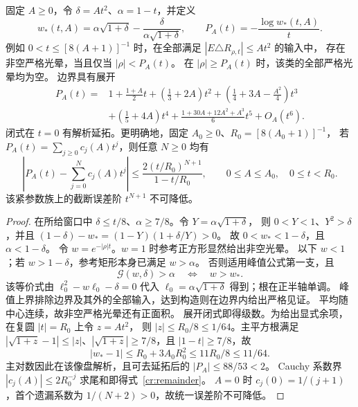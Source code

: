 \begin{corollary}[严格光晕的精确非空边界]\label{cr:phase}
固定 $A\ge0$，令 $\delta=At^2$、$\alpha=1-t$，并定义
\begin{equation}\label{cr:phase-exact}
 w_*(t,A)=\alpha\sqrt{1+\delta}-\frac{\delta}{\alpha\sqrt{1+\delta}},\qquad
 P_A(t)=-\frac{\log w_*(t,A)}t.
\end{equation}
例如 $0<t\le[8(A+1)]^{-1}$ 时，在全部满足 $|E\triangle R_{\rho,t}|\le At^2$ 的输入中，
存在非空严格光晕，当且仅当 $|\rho|<P_A(t)$。
在 $|\rho|\ge P_A(t)$ 时，该类的全部严格光晕均为空。
边界具有展开
\begin{align}\label{cr:phase-series}
 P_A(t)={}&1+\frac{1+A}{2}t+\left(\frac13+2A\right)t^2
 +\left(\frac14+3A-\frac{A^2}{4}\right)t^3\\
 &+\left(\frac15+4A\right)t^4
 +\frac{1+30A+12A^2+A^3}{6}t^5+O_A(t^6).\nonumber
\end{align}
闭式在 $t=0$ 有解析延拓。更明确地，固定 $A_0\ge0$、$R_0=[8(A_0+1)]^{-1}$，
若 $P_A(t)=\sum_{j\ge0}c_j(A)t^j$，则任意 $N\ge0$ 均有
\begin{equation}\label{cr:remainder}
 \left|P_A(t)-\sum_{j=0}^Nc_j(A)t^j\right|
 \le\frac{2(t/R_0)^{N+1}}{1-t/R_0},
 \qquad 0\le A\le A_0,\quad0\le t<R_0.
\end{equation}
该紧参数族上的截断误差阶 $t^{N+1}$ 不可降低。
\end{corollary}

\begin{proof}
在所给窗口中 $\delta\le t/8$、$\alpha\ge7/8$。令 $Y=\alpha\sqrt{1+\delta}$，
则 $0<Y<1$、$Y^2>\delta$，并且
$(1-\delta)-w_*=(1-Y)(1+\delta/Y)>0$。
故 $0<w_*<1-\delta$，且 $\alpha<1-\delta$。
令 $w=e^{-|\rho|t}$。$w=1$ 时参考正方形显然给出非空光晕。
以下 $w<1$；若 $w>1-\delta$，参考矩形本身已满足 $w>\alpha$。
否则适用峰值公式第一支，且
\[
 \mathcal G(w,\delta)>\alpha
 \quad\Longleftrightarrow\quad w>w_*.
\]
该等价式由 $\ell_0^2-w\ell_0-\delta=0$ 代入
$\ell_0=\alpha\sqrt{1+\delta}$ 得到；根在正半轴单调。
峰值上界排除边界及其外的全部输入，达到构造则在边界内给出严格见证。
平均随中心连续，故非空严格光晕还有正面积。
展开闭式即得级数。为给出显式余项，在复圆 $|t|=R_0$ 上令 $z=At^2$，
则 $|z|\le R_0/8\le1/64$。主平方根满足
$|\sqrt{1+z}-1|\le|z|$、$|\sqrt{1+z}|\ge7/8$，且 $|1-t|\ge7/8$，故
\[
 |w_*-1|\le R_0+3A_0R_0^2\le11R_0/8\le11/64.
\]
主对数因此在该像盘解析，且可去延拓后的 $|P_A|\le88/53<2$。
Cauchy 系数界 $|c_j(A)|\le2R_0^{-j}$ 求尾和即得式~\eqref{cr:remainder}。
$A=0$ 时 $c_j(0)=1/(j+1)$，首个遗漏系数为 $1/(N+2)>0$，故统一误差阶不可降低。
\end{proof}

